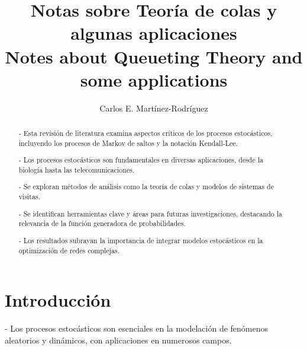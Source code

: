 \documentclass{article}
\title{Notas sobre Teor\'ia de colas y algunas aplicaciones\\
\small{Notes about Queueting Theory and some applications}}
\author{Carlos E. Martínez-Rodríguez}
\date{}
\renewcommand{\abstractname}{Resumen}
\numberwithin{equation}{section}
\newcommand{\acmclass}[1]{\noindent\textbf{ACM Class:} #1\\}
\newcommand{\mscclass}[1]{\noindent\textbf{MSC Class:} #1\\}
\begin{document}
\maketitle

\begin{abstract}
- Esta revisión de literatura examina aspectos críticos de los procesos estocásticos, incluyendo los procesos de Markov de saltos y la notación Kendall-Lee.

- Los procesos estocásticos son fundamentales en diversas aplicaciones, desde la biología hasta las telecomunicaciones.

- Se exploran métodos de análisis como la teoría de colas y modelos de sistemas de visitas.

- Se identifican herramientas clave y áreas para futuras investigaciones, destacando la relevancia de la función generadora de probabilidades.

- Los resultados subrayan la importancia de integrar modelos estocásticos en la optimización de redes complejas.

\end{abstract}

\begin{otherlanguage}{english}
\renewcommand{\abstractname}{Abstract} %
\begin{abstract}

\end{abstract}
\end{otherlanguage}

\tableofcontents

\section*{Introducción}
- Los procesos estocásticos son esenciales en la modelación de fenómenos aleatorios y dinámicos, con aplicaciones en numerosos campos.
\end{document}
